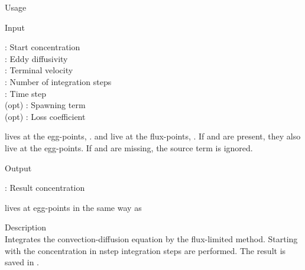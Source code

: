 {\begin{tdesc}
\item[Usage] 
\item[Input]
  \begin{vartab}
    \> : \> Start concentration \>  [eggs/m$^3$] \\
     \> : \> Eddy diffusivity    \>  [\sqmps]  \\
     \> : \> Terminal velocity   \>  [\mps]  \\
    \> : \> Number of integration steps \\
       \> : \> Time step           \>  [s] \\
       (opt) \> : \> Spawning term       \>  [eggs/m$^3$/s] \\
   (opt) \> : \> Loss coefficient \> [1/s] 
  \end{vartab}
   lives at the egg-points, .
   and  live at the flux-points, .
  If  and  are present, they also live at the egg-points.
  If  and  are missing, the source term is ignored. 
\item[Output]
  \begin{vartab}
   \>  : \> Result concentration \> [eggs/m$^3$]
  \end{vartab}
   lives at egg-points in the same way as 
\item[Description]\mbox{}\\
  Integrates the convection-diffusion equation by the 
  flux-limited method. Starting with the concentration 
  in  nstep integration steps  are performed. 
  The result is saved in .
\end{tdesc}



}
